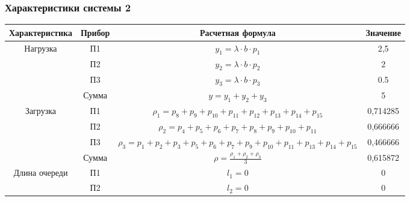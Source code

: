 \subsubsection{Характеристики системы 2}
\begin{adjustbox}{max width=\textwidth}
\begin{tabular}{|c|c|c|c|}
\hline
Характеристика                      & Прибор & Расчетная формула                                                                                        & Значение \\ \hline
\multirow{4}{*}{Нагрузка}           & П1     & $y_1 = \lambda\cdot b\cdot p_1$                                                                          & 2,5      \\ \cline{2-4}
                                    & П2     & $y_2 = \lambda\cdot b\cdot p_2$                                                                          & 2        \\ \cline{2-4}
                                    & П3     & $y_3 = \lambda\cdot b\cdot p_3$                                                                          & 0.5      \\ \cline{2-4}
                                    & Сумма  & $y = y_1 + y_2 + y_3$                                                                                    & 5        \\ \hline
\multirow{4}{*}{Загрузка}           & П1     & $\rho_1 = p_8 + p_9 + p_{10} + p_{11} + p_{12} + p_{13} + p_{14} + p_{15}$                               & 0,714285 \\ \cline{2-4}
                                    & П2     & $\rho_2 = p_4 + p_5 + p_6 + p_7 + p_8 + p_9 + p_{10} + p_{11}$                                           & 0,666666 \\ \cline{2-4}
                                    & П3     & $\rho_3 = p_1 + p_2 + p_3 + p_5 + p_6 + p_7 + p_9 + p_{10} + p_{11} + p_{13} + p_{14} + p_{15}$          & 0,466666 \\ \cline{2-4}
                                    & Сумма  & $\rho = \frac{\rho_1 + \rho_2 + \rho_3}{3}$                                                              & 0,615872 \\ \hline
\multirow{4}{*}{Длина очереди}      & П1     & $l_1 = 0$                                                                                                & 0        \\ \cline{2-4}
                                    & П2     & $l_2 = 0$                                                                                                & 0        \\ \cline{2-4}

\end{tabular}
\end{adjustbox}
